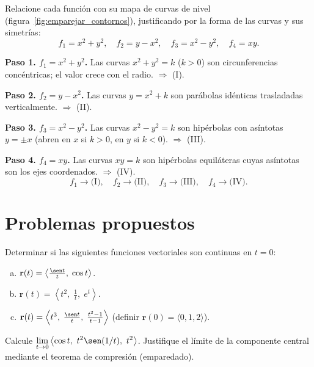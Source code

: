 \begin{example}
Relacione cada función con su mapa de curvas de nivel
(figura~\ref{fig:emparejar_contornos}), justificando por la forma de las
curvas y sus simetrías:
\[
  f_1=x^2+y^2,\quad f_2=y-x^2,\quad f_3=x^2-y^2,\quad f_4=xy.
\]
\begin{myproof}
\textbf{Paso 1. $f_1=x^2+y^2$.} Las curvas $x^2+y^2=k$ ($k>0$) son
circunferencias concéntricas; el valor crece con el radio. $\Rightarrow$ (I).

\textbf{Paso 2. $f_2=y-x^2$.} Las curvas $y=x^2+k$ son parábolas idénticas
trasladadas verticalmente. $\Rightarrow$ (II).

\textbf{Paso 3. $f_3=x^2-y^2$.} Las curvas $x^2-y^2=k$ son hipérbolas con
asíntotas $y=\pm x$ (abren en $x$ si $k>0$, en $y$ si $k<0$). $\Rightarrow$ (III).

\textbf{Paso 4. $f_4=xy$.} Las curvas $xy=k$ son hipérbolas equiláteras cuyas
asíntotas son los ejes coordenados. $\Rightarrow$ (IV).
\[
  \boxed{\ f_1\!\to\!\text{(I)},\quad f_2\!\to\!\text{(II)},\quad
  f_3\!\to\!\text{(III)},\quad f_4\!\to\!\text{(IV)}.\ }
\]
\end{myproof}
\end{example}

\section{Problemas propuestos}
\label{sec:problems-L1.1}


\begin{prob}
Determinar si las siguientes funciones vectoriales son continuas en $t=0$:
\begin{enumerate}[a)]
  \item $\mathbf{r}(t) = \left\langle \frac{\sen t}{t},\; \cos t \right\rangle$.
  \item $\mathbf{r}(t) = \left\langle t^2,\; \frac{1}{t},\; e^t \right\rangle$.
  \item $\mathbf{r}(t) = \left\langle t^3,\; \frac{\sen t}{t},\; \frac{t^2-1}{t-1} \right\rangle$
        (definir $\mathbf{r}(0)=\langle 0,1,2\rangle$).
\end{enumerate}
\end{prob}

\begin{prob}
Calcule $\displaystyle\lim_{t\to 0}\left\langle \cos t,\ t^2\sen(1/t),\ t^2
\right\rangle$. Justifique el límite de la componente central mediante el
teorema de compresión (emparedado).
\end{prob}

